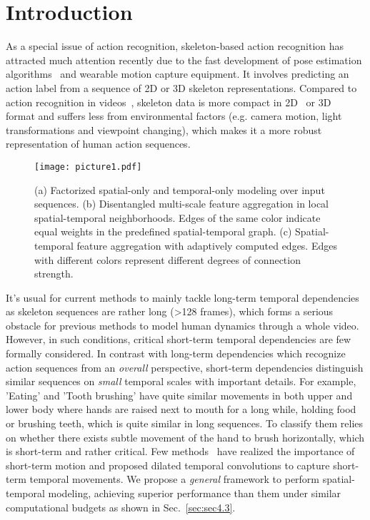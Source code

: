 \documentclass[runningheads]{llncs}
\begin{document}
\section{Introduction}
\label{sec:sec1}
As a special issue of action recognition, skeleton-based action recognition has attracted much attention recently due to the fast development of pose estimation algorithms~\cite{cao2017realtime,fang2017rmpe} and wearable motion capture equipment. It involves predicting an action label from a sequence of 2D or 3D skeleton representations. Compared to action recognition in videos~\cite{wang2018non,wang2016temporal,carreira2017quo}, skeleton data is more compact in 2D~\cite{kay2017kinetics,yan2018spatial} or 3D~\cite{liu2019ntu,shahroudy2016ntu} format and suffers less from environmental factors (e.g. camera motion, light transformations and viewpoint changing), which makes it a more robust representation of human action sequences.
  
\begin{figure}[t]
\centering
\texttt{[image: picture1.pdf]} 
\caption{(a) Factorized spatial-only and temporal-only modeling over input sequences. (b) Disentangled multi-scale feature aggregation in local spatial-temporal neighborhoods. Edges of the same color indicate equal weights in the predefined spatial-temporal graph. (c) Spatial-temporal feature aggregation with adaptively computed edges. Edges with different colors represent different degrees of connection strength.} \label{fig1}
\vspace{-15px}
\end{figure}

It's usual for current methods to mainly tackle long-term temporal dependencies as skeleton sequences are rather long (\textgreater 128 frames), which forms a serious obstacle for previous methods to model human dynamics through a whole video. However, in such conditions, critical short-term temporal dependencies are few formally considered. In contrast with long-term dependencies which recognize action sequences from an \textit{overall} perspective, short-term dependencies distinguish similar sequences on \textit{small} temporal scales with important details. For example, 'Eating' and 'Tooth brushing' have quite similar movements in both upper and lower body where hands are raised next to mouth for a long while, holding food or brushing teeth, which is quite similar in long sequences. To classify them relies on whether there exists subtle movement of the hand to brush horizontally, which is short-term and rather critical. Few methods~\cite{liu2020disentangling,zhang2020spatial} have realized the importance of short-term motion and proposed dilated temporal convolutions to capture short-term temporal movements. We propose a \textit{general} framework to perform spatial-temporal modeling, achieving superior performance than them under similar computational budgets as shown in Sec.~\ref{sec:sec4.3}.
  
\end{document}
